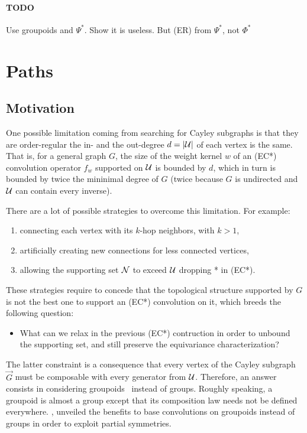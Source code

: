 \todo{}

\paragraph{TODO}
Use groupoids and $\Psi^*$.
Show it is useless.
But (ER) from $\Psi^*$, not $\Phi^*$


\section{Paths}


\subsection{Motivation}

One possible limitation coming from searching for Cayley subgraphs is that they are order-regular \ie the in- and the out-degree $d = |\mathcal{U}|$ of each vertex is the same. That is, for a general graph $G$, the size of the weight kernel $w$ of an (EC*) convolution operator $f_w$ supported on $\mathcal{U}$ is bounded by $d$, which in turn is bounded by twice the mininimal degree of $G$ (twice because $G$ is undirected and $\mathcal{U}$ can contain every inverse).

There are a lot of possible strategies to overcome this limitation. For example:
\begin{enumerate}
  \item connecting each vertex with its $k$-hop neighbors, with $k > 1$,
  \item artificially creating new connections for less connected vertices,
  \item allowing the supporting set $\mathcal{N}$ to exceed $\mathcal{U}$ \ie dropping * in (EC*).
\end{enumerate}

These strategies require to concede that the topological structure supported by $G$ is not the best one to support an (EC*) convolution on it, which breeds the following question:
\begin{itemize}
  \item What can we relax in the previous (EC*) contruction in order to unbound the supporting set, and still preserve the equivariance characterization?
\end{itemize}

The latter constraint is a consequence that every vertex of the Cayley subgraph $\vec{G}$ must be composable with every generator from $\mathcal{U}$. Therefore, an answer consists in considering groupoids~\citep{brandt1927verallgemeinerung} instead of groups. Roughly speaking, a groupoid is almost a group except that its composition law needs not be defined everywhere. \cite{weinstein1996groupoids}, unveiled the benefits to base convolutions on groupoids instead of groups in order to exploit partial symmetries.

